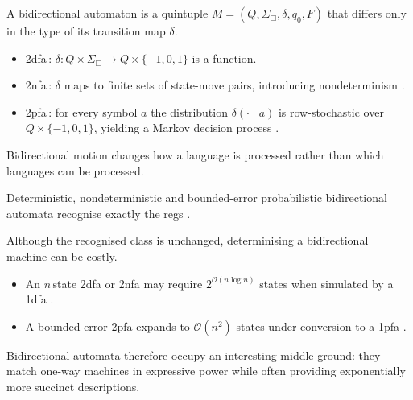 \begin{definition}\label{def:2dfa2nfa2pfa}
A bidirectional automaton is a quintuple
$M=(Q,\Sigma_{\Box},\delta,q_{0},F)$ that differs only
in the type of its transition map $\delta$.
\begin{itemize}
  \item \gls{2dfa}\,:  
        $\delta\colon Q\times\Sigma_{\Box}\to
                   Q\times\{-1,0,1\}$ is a function.
  \item \gls{2nfa}\,:  
        $\delta$ maps to finite sets of
        state-move pairs, introducing nondeterminism
        \cite{rabin1959finite}.
  \item \gls{2pfa}\,:  
        for every symbol $a$
        the distribution
        $\delta(\cdot\mid a)$ is row-stochastic over
        $Q\times\{-1,0,1\}$, yielding a Markov
        decision process
        \cite{freivalds1981probabilistic}.
\end{itemize}
\end{definition}

Bidirectional motion changes how a language is processed rather than
which languages can be processed.

\begin{theorem}\label{thm:two-way-reg}
Deterministic, nondeterministic and bounded-error probabilistic
bidirectional automata
recognise exactly the \glspl{reg}
\cite{shepherdson1959reduction,freivalds1981probabilistic}.
\end{theorem}

Although the recognised class is unchanged, determinising a bidirectional
machine can be costly.

\begin{proposition}\label{prop:two-way-cost}
\leavevmode\vspace{-0.5\baselineskip}
\begin{itemize}
  \item An \(n\)\,state \gls{2dfa} or \gls{2nfa} may require
        \(2^{\mathcal{O}(n\log n)}\) states when simulated by a \gls{1dfa}
        \cite{shepherdson1959reduction,rabin1959finite}.
  \item A bounded-error \gls{2pfa} expands to
        $\mathcal{O}(n^{2})$ states under conversion to
        a \gls{1pfa}
        \cite{dwork1992finite}.
\end{itemize}
\end{proposition}

Bidirectional automata therefore occupy an interesting
middle-ground: they match one-way machines in expressive power while
often providing exponentially more succinct descriptions.

